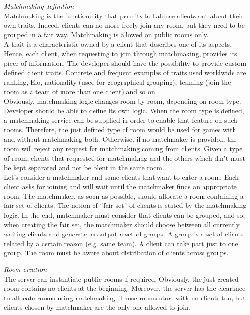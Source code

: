\bigskip
\textit{Matchmaking definition}
\\
Matchmaking is the functionality that permits to balance clients out about their own traits. Indeed, clients can no more freely join any room, but they need to be grouped in a fair way. Matchmaking is allowed on public rooms only.   
\\
A trait is a characteristic owned by a client that describes one of its aspects. Hence, each client, when requesting to join through matchmaking, provides its piece of information. The developer should have the possibility to provide custom defined client traits. Concrete and frequent examples of traits used worldwide are ranking, Elo, nationality (used for geographical grouping), teaming (join the room as a team of more than one client) and so on.
\\
Obviously, matchmaking logic changes room by room, depending on room type. Developer should be able to define its own logic.
When the room type is defined, a matchmaking service can be supplied in order to enable that feature on such rooms. Therefore, the just defined type of room would be used for games with and without matchmaking both. Otherwise, if no matchmaker is provided, the room will reject any request for matchmaking coming from clients.
Given a type of room, clients that requested for matchmaking and the others which din't must be kept separated and not be blent in the same room.
\\
Let's consider a matchmaker and some clients that want to enter a room. Each client asks for joining and will wait until the matchmaker finds an appropriate room. The matchmaker, as soon as possible, should allocate a room containing a fair set of clients. The notion of ``fair set'' of clients is stated by the matchmaking logic. In the end, matchmaker must consider that clients can be grouped, and so, when creating the fair set, the matchmaker should choose between all currently waiting clients and generate as output a set of groups. A group is a set of clients related by a certain reason (e.g. same team). A client can take part just to one group. The room must be aware about distribution of clients across groups.

\bigskip
\textit{Room creation}
\\
The server can instantiate public rooms if required. Obviously, the just created room contains no clients at the beginning.
Moreover, the server has the clearance to allocate rooms using matchmaking. Those rooms start with no clients too, but clients chosen by matchmaker are the only one allowed to join.


